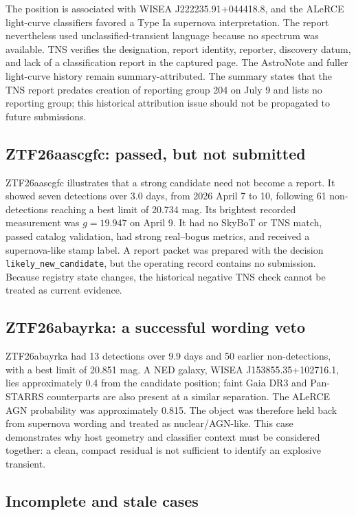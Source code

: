\documentclass[11pt]{article}
\begin{document}
The position is associated with WISEA J222235.91+044418.8, and the ALeRCE light-curve classifiers favored a Type Ia supernova interpretation. The report nevertheless used unclassified-transient language because no spectrum was available. TNS verifies the designation, report identity, reporter, discovery datum, and lack of a classification report in the captured page. The AstroNote and fuller light-curve history remain summary-attributed. The summary states that the TNS report predates creation of reporting group 204 on July 9 and lists no reporting group; this historical attribution issue should not be propagated to future submissions.

\subsection{ZTF26aascgfc: passed, but not submitted}

ZTF26aascgfc illustrates that a strong candidate need not become a report. It showed seven detections over 3.0 days, from 2026 April 7 to 10, following 61 non-detections reaching a best limit of 20.734 mag. Its brightest recorded measurement was $g=19.947$ on April 9. It had no SkyBoT or TNS match, passed catalog validation, had strong real--bogus metrics, and received a supernova-like stamp label. A report packet was prepared with the decision \texttt{likely\_new\_candidate}, but the operating record contains no submission. Because registry state changes, the historical negative TNS check cannot be treated as current evidence.

\subsection{ZTF26abayrka: a successful wording veto}

ZTF26abayrka had 13 detections over 9.9 days and 50 earlier non-detections, with a best limit of 20.851 mag. A NED galaxy, WISEA J153855.35+102716.1, lies approximately \SI{0.4}{\arcsec} from the candidate position; faint Gaia DR3 and Pan-STARRS counterparts are also present at a similar separation. The ALeRCE AGN probability was approximately 0.815. The object was therefore held back from supernova wording and treated as nuclear/AGN-like. This case demonstrates why host geometry and classifier context must be considered together: a clean, compact residual is not sufficient to identify an explosive transient.

\subsection{Incomplete and stale cases}
\end{document}
